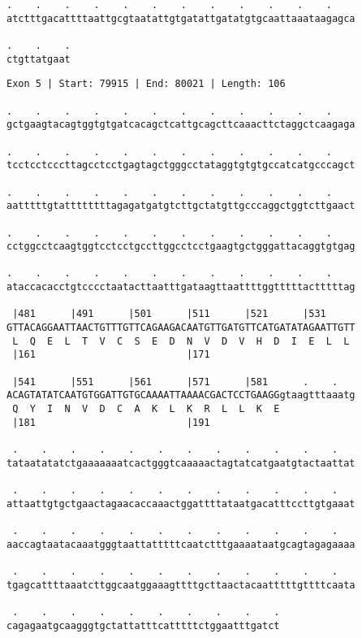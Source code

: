 \documentclass{article}
\begin{document}
\newpage
\begin{Verbatim}[fontfamily=courier]
.    .    .    .    .    .    .    .    .    .    .    .    
atctttgacattttaattgcgtaatattgtgatattgatatgtgcaattaaataagagca

.    .    .
ctgttatgaat
\end{Verbatim}
\newpage
\begin{Verbatim}[fontfamily=courier]
Exon 5 | Start: 79915 | End: 80021 | Length: 106

.    .    .    .    .    .    .    .    .    .    .    .    
gctgaagtacagtggtgtgatcacagctcattgcagcttcaaacttctaggctcaagaga

.    .    .    .    .    .    .    .    .    .    .    .    
tcctcctcccttagcctcctgagtagctgggcctataggtgtgtgccatcatgcccagct

.    .    .    .    .    .    .    .    .    .    .    .    
aatttttgtattttttttagagatgatgtcttgctatgttgcccaggctggtcttgaact

.    .    .    .    .    .    .    .    .    .    .    .    
cctggcctcaagtggtcctcctgccttggcctcctgaagtgctgggattacaggtgtgag

.    .    .    .    .    .    .    .    .    .    .    .    
ataccacacctgtcccctaatacttaatttgataagttaattttggtttttactttttag

 |481      |491      |501      |511      |521      |531     
GTTACAGGAATTAACTGTTTGTTCAGAAGACAATGTTGATGTTCATGATATAGAATTGTT
 L  Q  E  L  T  V  C  S  E  D  N  V  D  V  H  D  I  E  L  L 
 |161                          |171                         

 |541      |551      |561      |571      |581      .    .   
ACAGTATATCAATGTGGATTGTGCAAAATTAAAACGACTCCTGAAGGgtaagtttaaatg
 Q  Y  I  N  V  D  C  A  K  L  K  R  L  L  K  E             
 |181                          |191                         

 .    .    .    .    .    .    .    .    .    .    .    .   
tataatatatctgaaaaaaatcactgggtcaaaaactagtatcatgaatgtactaattat

 .    .    .    .    .    .    .    .    .    .    .    .   
attaattgtgctgaactagaacaccaaactggattttataatgacatttccttgtgaaat

 .    .    .    .    .    .    .    .    .    .    .    .   
aaccagtaatacaaatgggtaattatttttcaatctttgaaaataatgcagtagagaaaa

 .    .    .    .    .    .    .    .    .    .    .    .   
tgagcattttaaatcttggcaatggaaagttttgcttaactacaatttttgttttcaata

 .    .    .    .    .    .    .    .    .    .
cagagaatgcaagggtgctattatttcatttttctggaatttgatct
\end{Verbatim}
\end{document}
